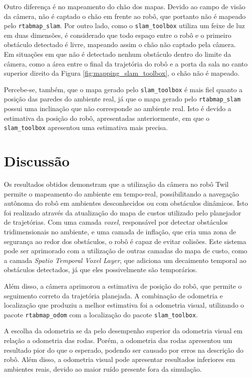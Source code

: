 \documentclass[repeatfields,xlists,xpacks,oneside,yearsonly]{ufrgscca}
\begin{document}
Outro diferença é no mapeamento do chão dos mapas. Devido ao campo de
visão da câmera, não é captado o chão em frente ao robô, que portanto
não é mapeado pelo \texttt{rtabmap\_slam}. Por outro lado, como o
\texttt{slam\_toolbox} utiliza um feixe de luz em duas dimensões, é
considerado que todo espaço entre o robô e o primeiro obstáculo
detectado é livre, mapeando assim o chão não captado pela câmera. Em
situações em que não é detectado nenhum obstáculo dentro do limite da
câmera, como a área entre o final da trajetória do robô e a porta da
sala no canto superior direito da Figura
\ref{fig:mapping_slam_toolbox}, o chão não é mapeado.

Percebe-se, também, que o mapa gerado pelo \texttt{slam\_toolbox} é
mais fiel quanto a posição das paredes do ambiente real, já que o
mapa gerado pelo \texttt{rtabmap\_slam} possui uma inclinação que não
corresponde ao ambiente real. Isto é devido a estimativa da posição
do robô, apresentadas anteriormente, em que o \texttt{slam\_toolbox}
apresentou uma estimativa mais precisa.

\chapter{Discussão}
\label{discussao}

Os resultados obtidos demonstram que a utilização da câmera no robô
Twil permite o mapeamento do ambiente em tempo-real, possibilitando a
navegação autônoma do robô em ambientes desconhecidos ou com
obstáculos dinâmicos. Isto foi realizado através da atualização do
mapa de custos utilizado pelo planejador de trajetórias. Com uma
camada \textit{voxel}, responsável por detectar obstáculos
tridimensionais no ambiente, e uma camada de inflação, que cria uma
zona de segurança ao redor dos obstáculos, o robô é capaz de evitar
colisões. Este sistema pode ser aprimorado com a utilização de outras
camadas do mapa de custo, como a camada \textit{Spatio Temporal Voxel
    Layer}, que adiciona um decaimento temporal ao obstáculos detectados,
já que eles possivelmente são temporários.

Além disso, a câmera aprimorou a estimativa de posição do robô, que
permite o seguimento correto da trajetória planejada. A combinação de
odometria e localização que produziu a melhor estimativa foi a
odometria visual, utilizando o pacote \texttt{rtabmap\_odom} com a
localização do pacote \texttt{slam\_toolbox}.

A escolha da odometria se da pelo desempenho superior da odometria
visual em relação a odometria das rodas. Porém, a odometria das rodas
apresentou um resultado pior do que o esperado, podendo ser causado
por erros na descrição do robô. Além disso, a odometria visual pode
apresentar resultados inferiores em ambientes reais, devido ao maior
ruído presente fora da simulação.
\end{document}
